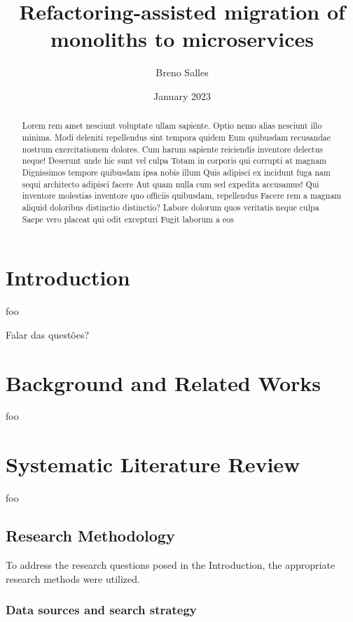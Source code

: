 \documentclass{article}
\title{Refactoring-assisted migration of monoliths to microservices}
\author{Breno Salles} \date{January 2023}
\begin{document}
\maketitle

\begin{abstract}

  Lorem rem amet nesciunt voluptate ullam sapiente. Optio nemo alias nesciunt
  illo minima. Modi deleniti repellendus sint tempora quidem Eum quibusdam
  recusandae nostrum exercitationem dolores. Cum harum sapiente reiciendis
  inventore delectus neque! Deserunt unde hic sunt vel culpa Totam in corporis
  qui corrupti at magnam Dignissimos tempore quibusdam ipsa nobis illum Quis
  adipisci ex incidunt fuga nam sequi architecto adipisci facere Aut quam nulla
  cum sed expedita accusamus! Qui inventore molestias inventore quo officiis
  quibusdam, repellendus Facere rem a magnam aliquid doloribus distinctio
  distinctio? Labore dolorum quos veritatis neque culpa Saepe vero placeat qui
  odit excepturi Fugit laborum a eos

\end{abstract}

\section{Introduction} foo

Falar das questões?

\section{Background and Related Works} foo

\section{Systematic Literature Review} foo

\subsection{Research Methodology} \label{sub:research-methodology}

To address the research questions posed in the Introduction, the appropriate
research methods were utilized.

\subsubsection{Data sources and search strategy}
\end{document}
